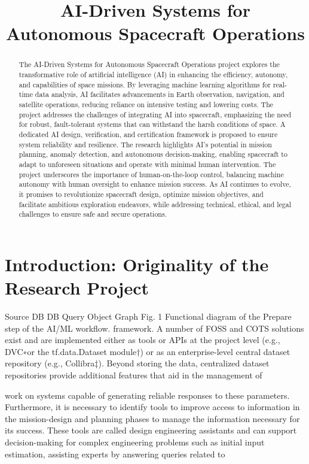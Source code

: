 \documentclass[a4paper,12pt]{article}
\title{AI-Driven Systems for Autonomous Spacecraft Operations}
\author{}
\date{}
\begin{document}
\maketitle
\begin{abstract}
The AI-Driven Systems for Autonomous Spacecraft Operations project explores the transformative role of artificial intelligence (AI) in enhancing the efficiency, autonomy, and capabilities of space missions. By leveraging machine learning algorithms for real-time data analysis, AI facilitates advancements in Earth observation, navigation, and satellite operations, reducing reliance on intensive testing and lowering costs. The project addresses the challenges of integrating AI into spacecraft, emphasizing the need for robust, fault-tolerant systems that can withstand the harsh conditions of space. A dedicated AI design, verification, and certification framework is proposed to ensure system reliability and resilience. The research highlights AI's potential in mission planning, anomaly detection, and autonomous decision-making, enabling spacecraft to adapt to unforeseen situations and operate with minimal human intervention. The project underscores the importance of human-on-the-loop control, balancing machine autonomy with human oversight to enhance mission success. As AI continues to evolve, it promises to revolutionize spacecraft design, optimize mission objectives, and facilitate ambitious exploration endeavors, while addressing technical, ethical, and legal challenges to ensure safe and secure operations.
\end{abstract}
\tableofcontents
\newpage
\section{Introduction: Originality of the Research Project}

Source
DB
DB
Query
Object
Graph
Fig. 1
Functional diagram of the Prepare step of the AI/ML workﬂow.
framework. A number of FOSS and COTS solutions exist and are implemented either as tools or APIs at the project
level (e.g., DVC∗or the tf.data.Dataset module†) or as an enterprise-level central dataset repository (e.g., Collibra‡).
Beyond storing the data, centralized dataset repositories provide additional features that aid in the management of

work on systems capable of generating reliable responses to these parameters. Furthermore,
it is necessary to identify tools to improve access to information in the mission-design and
planning phases to manage the information necessary for its success. These tools are called
design engineering assistants and can support decision-making for complex engineering
problems such as initial input estimation, assisting experts by answering queries related to
\end{document}
